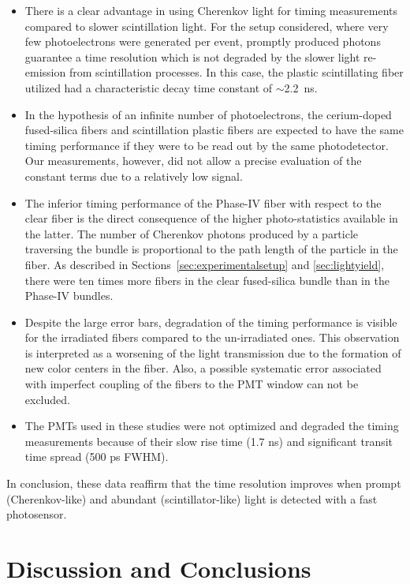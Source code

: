 \documentclass[a4paper,11pt]{article}
\begin{document}
\begin{itemize}
\item There is a clear advantage in using Cherenkov light for timing measurements compared to slower scintillation light. For the setup considered, where very few photoelectrons were generated per event, promptly produced photons guarantee a time resolution which is not degraded by the slower light re-emission from scintillation processes. In this case, the plastic scintillating fiber utilized had a characteristic decay time constant of $\sim$2.2~ns.
\item In the hypothesis of an infinite number of photoelectrons, the cerium-doped fused-silica fibers and scintillation plastic fibers are expected to have the same timing performance if they were to be read out by the same photodetector. Our measurements, however, did not allow a precise evaluation of the constant terms due to a relatively low signal.
\item The inferior timing performance of the Phase-IV fiber with respect to the clear fiber is the direct consequence of the higher photo-statistics available in the latter. The number of Cherenkov photons produced by a particle traversing the bundle is proportional to the path length of the particle in the fiber. As described in Sections~\ref{sec:experimentalsetup} and \ref{sec:lightyield}, there were ten times more fibers in the clear fused-silica bundle than in the Phase-IV bundles.
\item Despite the large error bars, degradation of the timing performance is visible for the irradiated fibers compared to the un-irradiated ones. This observation is interpreted as a worsening of the light transmission due to the formation of new color centers in the fiber. Also, a possible systematic error associated with imperfect coupling of the fibers to the PMT window can not be excluded.
\item The PMTs used in these studies were not optimized and degraded the timing measurements because of their slow rise time (1.7 ns) and significant transit time spread (500 ps FWHM). 
\end{itemize}
In conclusion, these data reaffirm that the time resolution improves when prompt (Cherenkov-like) and abundant (scintillator-like) light is detected with a fast photosensor.

\section{Discussion and Conclusions}
\label{sec:conclusions}
\end{document}
